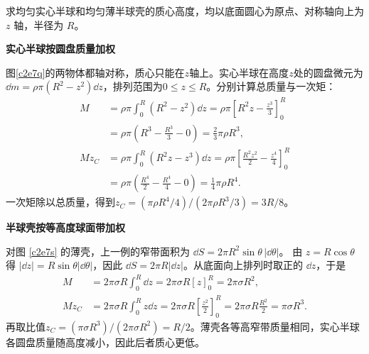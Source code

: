 \begin{question}
\begin{example}[实心半球与半球壳的质心]
求均匀实心半球和均匀薄半球壳的质心高度，均以底面圆心为原点、对称轴向上为 $z$ 轴，半径为 $R$。
\end{example}
\end{question}
\begin{solution}\textbf{实心半球按圆盘质量加权}\par\nobreak
图\ref{c2e7q}的两物体都轴对称，质心只能在$z$轴上。实心半球在高度$z$处的圆盘微元为$\dd m=\rho\pi(R^2-z^2)\dd z$，排列范围为$0\le z\le R$。分别计算总质量与一次矩：
\begin{align*}
M&=\rho\pi\int_0^R(R^2-z^2)\dd z
=\rho\pi\left[R^2z-\frac{z^3}{3}\right]_0^R\\
&=\rho\pi\left(R^3-\frac{R^3}{3}-0\right)
=\frac23\pi\rho R^3,\\
Mz_C&=\rho\pi\int_0^R(R^2z-z^3)\dd z
=\rho\pi\left[\frac{R^2z^2}{2}-\frac{z^4}{4}\right]_0^R\\
&=\rho\pi\left(\frac{R^4}{2}-\frac{R^4}{4}-0\right)
=\frac14\pi\rho R^4.
\end{align*}
一次矩除以总质量，得到$z_C=(\pi\rho R^4/4)/(2\pi\rho R^3/3)=3R/8$。



\par\medskip{}\noindent\textbf{半球壳按等高度球面带加权}\par\nobreak
对图 \ref{c2e7s} 的薄壳，上一例的窄带面积为
$\dd S=2\pi R^2\sin\theta\,|\dd\theta|$。
由 $z=R\cos\theta$ 得 $|\dd z|=R\sin\theta|\dd\theta|$，因此 $\dd S=2\pi R|\dd z|$。从底面向上排列时取正的 $\dd z$，于是
\begin{align*}
M&=2\pi\sigma R\int_0^R\dd z
=2\pi\sigma R[z]_0^R=2\pi\sigma R^2,\\
Mz_C&=2\pi\sigma R\int_0^R z\dd z
=2\pi\sigma R\left[\frac{z^2}{2}\right]_0^R
=2\pi\sigma R\frac{R^2}{2}=\pi\sigma R^3.
\end{align*}
再取比值$z_C=(\pi\sigma R^3)/(2\pi\sigma R^2)=\boxed{R/2}$。薄壳各等高窄带质量相同，实心半球各圆盘质量随高度减小，因此后者质心更低。
\end{solution}

